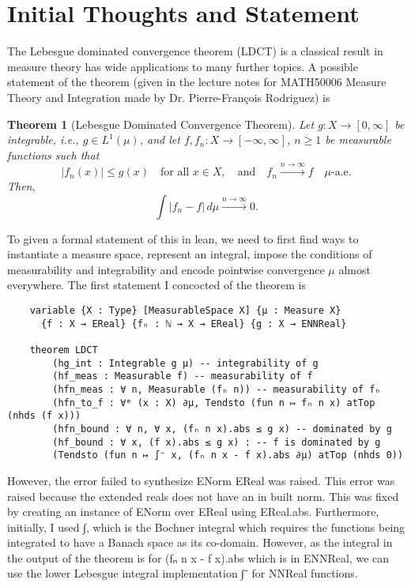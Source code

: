 \documentclass{article}
\renewcommand{\texttt}[1]{{\small\ttfamily #1}}
\newtheorem{Theorem}{Theorem}
\begin{document}
\section*{Initial Thoughts and Statement}

The Lebesgue dominated convergence theorem (LDCT) is a classical result in measure theory has wide applications to many further topics. A possible statement of the theorem (given in the lecture notes for MATH50006 Measure Theory and Integration made by Dr. Pierre-François Rodriguez) is 

\begin{adjustwidth}{1cm}{1cm}
\begin{Theorem}[Lebesgue Dominated Convergence Theorem]
    Let \( g : X \to [0, \infty] \) be integrable, i.e., \( g \in L^1(\mu) \), and let \( f, f_n : X \to [-\infty, \infty] \), \( n \geq 1 \) be measurable functions such that
    \[
        |f_n(x)| \leq g(x) \quad \text{for all } x \in X, \quad \text{and} \quad f_n \xrightarrow{n \to \infty} f \quad \mu\text{-a.e.}
    \]
    Then,
    \[
        \int |f_n - f| \, d\mu 
        \xrightarrow{n \to \infty} 0.
    \]
\end{Theorem}
\end{adjustwidth}
\vspace{0.5cm}

To given a formal statement of this in lean, we need to first find ways to instantiate a measure space, represent an integral, impose the conditions of measurability and integrability and encode pointwise convergence \(\mu\) almost everywhere. The first statement I concocted of the theorem is

\begin{verbatim}
    variable {X : Type} [MeasurableSpace X] {μ : Measure X}
      {f : X → EReal} {fₙ : ℕ → X → EReal} {g : X → ENNReal}
    
    theorem LDCT
        (hg_int : Integrable g μ) -- integrability of g
        (hf_meas : Measurable f) -- measurability of f
        (hfn_meas : ∀ n, Measurable (fₙ n)) -- measurability of fₙ
        (hfn_to_f : ∀ᵐ (x : X) ∂μ, Tendsto (fun n ↦ fₙ n x) atTop (nhds (f x)))
        (hfn_bound : ∀ n, ∀ x, (fₙ n x).abs ≤ g x) -- dominated by g
        (hf_bound : ∀ x, (f x).abs ≤ g x) : -- f is dominated by g
        (Tendsto (fun n ↦ ∫⁻ x, (fₙ n x - f x).abs ∂μ) atTop (nhds 0))
\end{verbatim}

However, the error \texttt{failed to synthesize ENorm EReal} was raised. This error was raised because the extended reals does not have an in built norm. This was fixed by creating an instance of ENorm over EReal using \texttt{EReal.abs}. Furthermore, initially, I used \texttt{∫}, which is the Bochner integral which requires the functions being integrated to have a Banach space as its co-domain. However, as the integral in the output of the theorem is for \texttt{(fₙ n x - f x).abs} which is in \texttt{ENNReal}, we can use the lower Lebesgue integral implementation \texttt{∫⁻} for \texttt{NNReal} functions.
\end{document}
